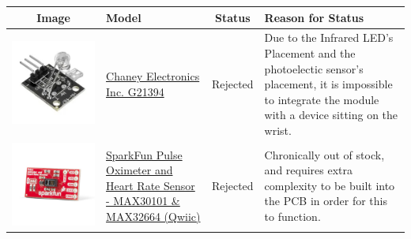 \documentclass[12pt, titlepage]{article}
\begin{document}
\begin{table}[H]
\begin{tabular}{ | c | m{3cm} | c | m{7cm} |}
\hline
\textbf{Image} & \textbf{Model} & \textbf{Status} & \textbf{Reason for Status}\\
\hline
 \includegraphics[scale = 0.5]{G21394} & \href{https://secure.sayal.com/STORE2/View_SHOP.php?SKU=247799}{Chaney Electronics Inc. G21394}  & Rejected & Due to the Infrared LED's Placement and the photoelectic sensor's placement, it is impossible to integrate the module with a device sitting on the wrist.\\
\hline
 \includegraphics[scale = 0.5]{sparkfun} & \href{https://www.sparkfun.com/products/15219}{SparkFun Pulse Oximeter and Heart Rate Sensor - MAX30101 \& MAX32664 (Qwiic)}  & Rejected & Chronically out of stock, and requires extra complexity to be built into the PCB in order for this to function.\\

\end{tabular}
\end{table}
\end{document}
